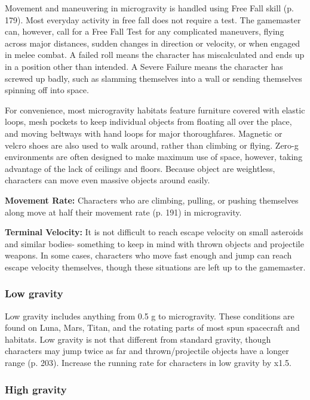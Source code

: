 Movement and maneuvering in microgravity is handled using Free Fall skill (p. 179). Most everyday activity in free fall does not require a test. The gamemaster can, however, call for a Free Fall Test for any complicated maneuvers, flying across major distances, sudden changes in direction or velocity, or when engaged in melee combat. A failed roll means the character has miscalculated and ends up in a position other than intended. A Severe Failure means the character has screwed up badly, such as slamming themselves into a wall or sending themselves spinning off into space.

For convenience, most microgravity habitats feature furniture covered with elastic loops, mesh pockets to keep individual objects from floating all over the place, and moving beltways with hand loops for major thoroughfares. Magnetic or velcro shoes are also used to walk around, rather than climbing or flying. Zero-g environments are often designed to make maximum use of space, however, taking advantage of the lack of ceilings and floors. Because object are weightless, characters can move even massive objects around easily.

\textbf{Movement Rate:} Characters who are climbing, pulling, or pushing themselves along move at half their movement rate (p. 191) in microgravity.

\textbf{Terminal Velocity:} It is not difficult to reach escape velocity on small asteroids and similar bodies- something to keep in mind with thrown objects and projectile weapons. In some cases, characters who move fast enough and jump can reach escape velocity themselves, though these situations are left up to the gamemaster.

\subsubsection{Low gravity}

Low gravity includes anything from 0.5 g to microgravity. These conditions are found on Luna, Mars, Titan, and the rotating parts of most spun spacecraft and habitats. Low gravity is not that different from standard gravity, though characters may jump twice as far and thrown/projectile objects have a longer range (p. 203). Increase the running rate for characters in low gravity by x1.5.

\subsubsection{High gravity}

